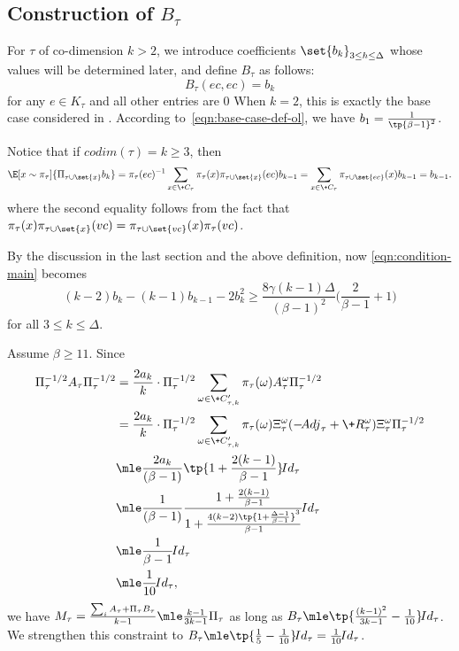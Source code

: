 \subsection{Construction of $B_\tau$}
\label{sss:Btau}
For $\tau$ of co-dimension $k > 2$,
we introduce coefficients $\set{b_k}_{3 \leq h \leq \Delta}$
whose values will be determined later, and define $B_\tau$ as follows:
\begin{equation} \label{eqn:B-def}
	B_\tau(ec,ec) = b_{k}
\end{equation}
for any $e \in K_\tau$ and all other entries are $0$
When $k=2$, this is exactly the base case considered in .
According to~\eqref{eqn:base-case-def-ol}, we have $b_1=\frac1{\tp{\beta-1}^2}$.

Notice that if $\!{codim}(\tau) = k\ge 3$, then
\begin{align}
\E[x\sim\pi_\tau]{\Pi_{\tau\cup\set{x}} b_k}
=
\pi_\tau(ec)^{-1}\sum_{x\in \+C_\tau}{\pi_\tau(x)\pi_{\tau\cup \set{x}}(ec)} b_{k-1}
=
\sum_{x\in \+C_\tau}{\pi_{\tau\cup \set{ec}}(x) b_{k-1}} = b_{k-1}.
\label{eqn:contraint-B-entry}
\end{align}
where the second equality follows from the fact that $\pi_\tau(x)\pi_{\tau\cup \set{x}}(vc)=\pi_{\tau\cup\set{vc}}(x)\pi_\tau(vc)$. %

By the discussion in the last section and the above definition, now \cref{eqn:condition-main} 
becomes
\[
(k-2)b_k - (k-1)b_{k-1} - 2b_k^2 \ge 
    \frac{8\gamma(k-1)\Delta}{(\beta-1)^2}\Big(\frac{2}{\beta-1} + 1\Big)
\]
for all $3\le k \le \Delta$.

Assume $\beta \geq 11$. Since 
\begin{align}\label{eqn:A-tau-i-upper-bound}
\begin{split}
		\Pi_\tau^{-1/2}A_\tau\Pi_\tau^{-1/2}
		&=  \frac{2a_{k}}{k}\cdot \Pi_\tau^{-1/2} \sum_{\omega\in \+C'_{\tau,k}}\pi_\tau(\omega) A^{\omega}_\tau \Pi_\tau^{-1/2} \\
		&=  \frac{2a_{k}}{k}\cdot \Pi_\tau^{-1/2} \sum_{\omega\in \+C_{\tau,k}'}\pi_\tau(\omega) \Xi_\tau^{\omega}(-\!{Adj}_\tau +\+R_\tau^{\omega})\Xi_\tau^{\omega}\Pi_\tau^{-1/2}\\
		&\mle \frac{2a_{k}}{(\beta-1)}\tp{1+\frac{2(k-1)}{\beta-1}}\!{Id}_\tau\\
		&\mle \frac{1}{(\beta-1)}\frac{1+\frac{2(k-1)}{\beta-1}}{1+\frac{4(k-2) \tp{1+\frac{\Delta-1}{\beta-1}}^3} {\beta-1}}\!{Id}_\tau\\
        &\mle \frac{1}{\beta-1} \!{Id}_\tau\\
		&\mle \frac{1}{10}\!{Id}_\tau,
\end{split}
\end{align}
we have $M_\tau=\frac{\sum_i A_\tau + \Pi_\tau B_\tau}{k-1} \mle \frac{k-1}{3k-1}\Pi_\tau$ as long as $B_\tau \mle \tp{\frac{(k-1)^2}{3k-1}-\frac{1}{10}}\!{Id}_\tau$.
We strengthen this constraint to $B_\tau \mle \tp{\frac{1}{5}-\frac{1}{10}}\!{Id}_\tau=\frac{1}{10}\!{Id}_\tau$.

